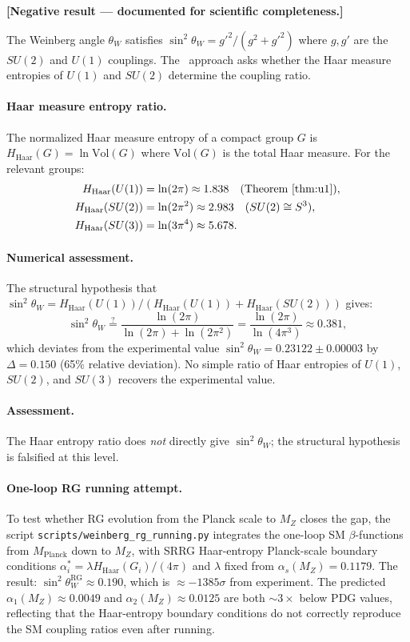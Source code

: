 \documentclass[11pt]{article}
\theoremstyle{remark}
\newcommand{\SRRG}{\text{SRRG}}
\begin{document}
\begin{appendices}
\noindent\textbf{[Negative result --- documented for scientific completeness.]}

The Weinberg angle $\theta_W$ satisfies $\sin^2\theta_W = g'^2/(g^2 + g'^2)$
where $g, g'$ are the $SU(2)$ and $U(1)$ couplings.  The \SRRG\ approach asks whether
the Haar measure entropies of $U(1)$ and $SU(2)$ determine the coupling ratio.

\paragraph{Haar measure entropy ratio.}
The normalized Haar measure entropy of a compact group $G$ is
$H_{\mathrm{Haar}}(G) = \ln \mathrm{Vol}(G)$ where $\mathrm{Vol}(G)$ is the total
Haar measure.  For the relevant groups:
\begin{align*}
H_{\mathrm{Haar}}(U(1)) &= \ln(2\pi) \approx 1.838 \quad \text{(Theorem~\ref{thm:u1})},\\
H_{\mathrm{Haar}}(SU(2)) &= \ln(2\pi^2) \approx 2.983 \quad \text{($SU(2) \cong S^3$)},\\
H_{\mathrm{Haar}}(SU(3)) &= \ln(3\pi^4) \approx 5.678.
\end{align*}

\paragraph{Numerical assessment.}
The structural hypothesis that $\sin^2\theta_W = H_{\mathrm{Haar}}(U(1)) / (H_{\mathrm{Haar}}(U(1)) + H_{\mathrm{Haar}}(SU(2)))$
gives:
\[
\sin^2\theta_W \stackrel{?}{=}
  \frac{\ln(2\pi)}{\ln(2\pi) + \ln(2\pi^2)}
= \frac{\ln(2\pi)}{\ln(4\pi^3)}
\approx 0.381,
\]
which deviates from the experimental value $\sin^2\theta_W = 0.23122 \pm 0.00003$
\cite{ParticleDataGroup2022} by $\Delta = 0.150$ (65\% relative deviation).  No simple ratio
of Haar entropies of $U(1)$, $SU(2)$, and $SU(3)$ recovers the experimental value.

\paragraph{Assessment.}
The Haar entropy ratio does \emph{not} directly give $\sin^2\theta_W$; the
structural hypothesis is falsified at this level.

\paragraph{One-loop RG running attempt.}
To test whether RG evolution from the Planck scale to $M_Z$ closes the gap,
the script \texttt{scripts/weinberg\_rg\_running.py} integrates the one-loop SM
$\beta$-functions from $M_{\mathrm{Planck}}$ down to $M_Z$, with SRRG
Haar-entropy Planck-scale boundary conditions
$\alpha_i^* = \lambda H_{\mathrm{Haar}}(G_i)/(4\pi)$ and $\lambda$ fixed from
$\alpha_s(M_Z) = 0.1179$.
The result: $\sin^2\theta_W^{\mathrm{RG}} \approx 0.190$, which is
${\approx}-1385\sigma$ from experiment.  The predicted $\alpha_1(M_Z) \approx 0.0049$
and $\alpha_2(M_Z) \approx 0.0125$ are both ${\sim}3\times$ below PDG values,
reflecting that the Haar-entropy boundary conditions do not correctly reproduce
the SM coupling ratios even after running.


\end{appendices}
\end{document}
